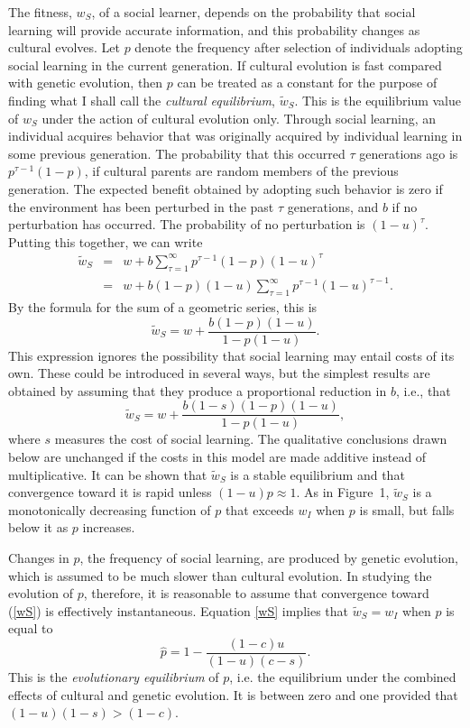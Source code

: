 \documentclass[11pt]{article}
\begin{document}
The fitness, $w_S$, of a social learner, depends on the probability that
social learning will provide accurate information, and this probability
changes as cultural evolves.  Let $p$ denote the frequency after selection
of individuals adopting social learning in the current generation.  If
cultural evolution is fast compared with genetic evolution, then $p$ can
be treated as a constant for the purpose of finding what I shall call the
\emph{cultural equilibrium}, $\tilde{w}_S$.  This is the equilibrium value
of $w_S$ under the action of cultural evolution only.  Through social
learning, an individual acquires behavior that was originally acquired by
individual learning in some previous generation.  The probability that
this occurred $\tau$ generations ago is $p^{\tau - 1}(1-p)$, if
cultural parents are random members of the previous generation.  The
expected benefit obtained by adopting such behavior is zero if the
environment has been perturbed in the past $\tau$ generations, and $b$ if
no perturbation has occurred.  The probability of no perturbation is $(1 -
u)^{\tau}$.  Putting this together, we can write
\begin{eqnarray*}
\tilde{w}_{S} & = & \displaystyle w + b\sum_{\tau =1}^{\infty}
p^{\tau -1} (1 - p)(1 - u)^{\tau}  \\
     & = & \displaystyle w + b(1 - p)(1 - u)\sum_{\tau =1}^\infty
p^{\tau -1} (1 - u)^{\tau -1} .
\end{eqnarray*}
By the formula for the sum of a geometric series, this is
\[
\tilde{w}_S  = w + \frac{b(1 - p)(1 - u)}{1 - p(1 - u)} .
\]
This expression ignores the possibility that social learning may entail
costs of its own.  These could be introduced in several ways, but the
simplest results are obtained by assuming that they produce a proportional
reduction in $b$, i.e., that  
\begin{equation} \label{wS}
\tilde{w}_S  = w + \frac{b(1 - s)(1 - p)(1 - u)}
                        {1 - p(1 - u)} ,
\end{equation}
where $s$ measures the cost of social learning.  The qualitative
conclusions drawn below are unchanged if the costs in this model are made
additive instead of multiplicative.  It can be shown that $\tilde{w}_S$
is a stable equilibrium and that convergence toward it is rapid unless 
$(1 - u )p \approx 1$.  As in Figure~1, $\tilde{w}_S$ is a monotonically
decreasing function of $p$ that exceeds $w_I$ when $p$ is small, but falls
below it as $p$ increases. 

Changes in $p$, the frequency of social learning, are produced by genetic
evolution, which is assumed to be much slower than cultural evolution.  In
studying the evolution of $p$, therefore, it is reasonable to assume that
convergence toward (\ref{wS}) is effectively instantaneous.  Equation
\ref{wS} implies that $\tilde{w}_S = w_I$ when $p$ is equal to
\[
\hat{p}  = 1 - \frac{(1 - c)u}{(1 - u)(c - s)} .
\]
This is the \emph{evolutionary equilibrium} of $p$, i.e. the equilibrium
under the combined effects of cultural and genetic evolution.  It is
between zero and one provided that $(1 - u)(1 - s)  >  (1 - c)$.  
\end{document}
